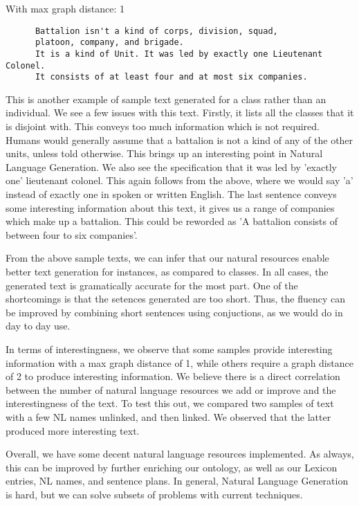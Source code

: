 \documentclass[12pt, letterpaper]{article}
\begin{document}
  With max graph distance: 1
  \begin{lstlisting}
	  Battalion isn't a kind of corps, division, squad, 
	  platoon, company, and brigade. 
	  It is a kind of Unit. It was led by exactly one Lieutenant Colonel. 
	  It consists of at least four and at most six companies.
  \end{lstlisting}

  \vspace{4mm}

  \noindent
  This is another example of sample text generated for a class rather than an individual.
  We see a few issues with this text. Firstly, it lists all the classes that it is disjoint with.
  This conveys too much information which is not required. 
  Humans would generally assume that a battalion is not a kind of any of the other units, unless told otherwise.
  This brings up an interesting point in Natural Language Generation.
  We also see the specification that it was led by 'exactly one' lieutenant colonel. 
  This again follows from the above, where we would say 'a' instead of exactly one in spoken or written English.
  The last sentence conveys some interesting information about this text, it gives us a range of companies which make up
  a battalion.
  This could be reworded as 'A battalion consists of between four to six companies'.

  \vspace{4mm}

  \noindent
  From the above sample texts, we can infer that our natural resources enable better text generation for instances,
  as compared to classes.
  In all cases, the generated text is gramatically accurate for the most part.
  One of the shortcomings is that the setences generated are too short.
  Thus, the fluency can be improved by combining short sentences using conjuctions, as we would do in day to day use.

  \vspace{4mm}

  \noindent
  In terms of interestingness, we observe that some samples provide interesting information with a max graph distance of 1,
  while others require a graph distance of 2 to produce interesting information.
  We believe there is a direct correlation between the number of natural language resources we add or improve and the
  interestingness of the text.
  To test this out, we compared two samples of text with a few NL names unlinked, and then linked.
  We observed that the latter produced more interesting text.

  \vspace{4mm}

  \noindent
  Overall, we have some decent natural language resources implemented.
  As always, this can be improved by further enriching our ontology, as well as our Lexicon entries, NL names, and sentence plans.
  In general, Natural Language Generation is hard, but we can solve subsets of problems with current techniques.
\end{document}
